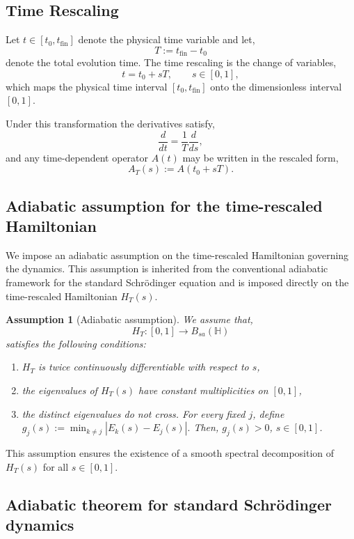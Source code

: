 \documentclass[pdflatex,sn-mathphys-num]{sn-jnl}
\theoremstyle{thmstyleone}
\theoremstyle{thmstyletwo}
\theoremstyle{thmstylethree}
\newtheorem{assumption}[theorem]{Assumption}
\begin{document}
\subsection{Time Rescaling}

Let $t\in[t_0,t_{\mathrm{fin}}]$ denote the physical time variable and let,
\[
T:=t_{\mathrm{fin}}-t_0
\]
denote the total evolution time. The time rescaling is the change of
variables,
\[
t = t_0 + sT, \qquad s\in[0,1],
\]
which maps the physical time interval $[t_0,t_{\mathrm{fin}}]$ onto the
dimensionless interval $[0,1]$.

Under this transformation the derivatives satisfy,
\[
\frac{d}{dt} = \frac{1}{T}\frac{d}{ds},
\]
and any time-dependent operator $A(t)$ may be written in the rescaled form,
\[
A_T(s):=A(t_0+sT).
\]

\subsection{Adiabatic assumption for the time-rescaled Hamiltonian}

We impose an adiabatic assumption on the time-rescaled Hamiltonian governing the
dynamics. This assumption is inherited from the conventional adiabatic framework for the
standard Schr\"odinger equation and is imposed directly on the time-rescaled Hamiltonian
$H_T(s)$.

\begin{assumption}[Adiabatic assumption] \label{AA}
We assume that,
\[
H_T:[0,1]\longrightarrow B_{sa}(\mathbb H)
\]
satisfies the following conditions:
\begin{enumerate}
\item \(H_T\) is twice continuously differentiable with respect to \(s\),
\item the eigenvalues of \(H_T(s)\) have constant multiplicities on \([0,1]\),
\item the distinct eigenvalues do not cross. For every fixed \(j\), define $g_{j}(s):=\min_{k\neq j}|E_{k}(s)-E_{j}(s)|.$
Then, $g_{j}(s)>0$, $s\in[0,1]$.
\end{enumerate}
\end{assumption}

This assumption ensures the existence of a smooth spectral decomposition of $H_T(s)$ for all $s\in[0,1]$.


\subsection{Adiabatic theorem for standard Schr\"odinger dynamics}
\end{document}

